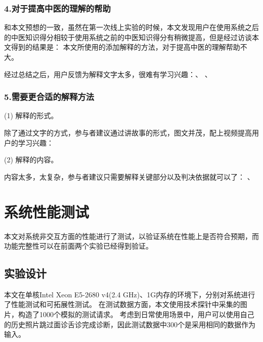 \subsubsection{4.对于提高中医的理解的帮助}
和本文预想的一致，虽然在第一次线上实验的时候，本文发现用户在使用系统之后的中医知识得分相较于使用系统之前的中医知识得分有稍微提高，但是经过访谈本文得到的结果是：
本文所使用的添加解释的方法，对于提高中医的理解帮助不大。

经过总结之后，用户反馈为解释文字太多，很难有学习兴趣：、
、


\subsubsection{5.需要更合适的解释方法}
(1) 解释的形式。

除了通过文字的方式，参与者建议通过讲故事的形式，图文并茂，配上视频提高用户的学习兴趣：

(2) 解释的内容。

内容太多，太复杂，参与者建议只需要解释关键部分以及判决依据就可以了：
、


\section{系统性能测试}
本文对系统非交互方面的性能进行了测试，以验证系统在性能上是否符合预期，而功能完整性可以在前面两个实验已经得到验证。

\subsection{实验设计}

本文在单核Intel Xeon E5-2680 v4(2.4 GHz)、1G内存的环境下，分别对系统进行了性能测试和可拓展性测试。
在测试数据方面，本文使用技术探针中采集的图片，构造了1000个模拟的测试请求。
考虑到日常使用场景中，用户可以使用自己的历史照片跳过面诊舌诊完成诊断，因此测试数据中300个是采用相同的数据作为输入。

